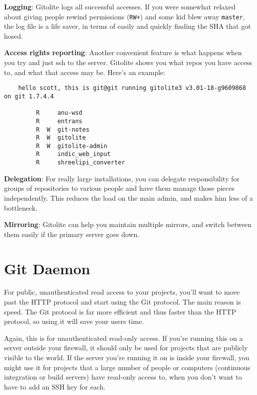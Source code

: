 \documentclass[a4paper]{book}
\begin{document}
\textbf{Logging}: Gitolite logs all successful accesses. If you were somewhat relaxed about giving people rewind permissions (\texttt{RW+}) and some kid blew away \texttt{master}, the log file is a life saver, in terms of easily and quickly finding the SHA that got hosed.

\textbf{Access rights reporting}: Another convenient feature is what happens when you try and just ssh to the server. Gitolite shows you what repos you have access to, and what that access may be. Here's an example:

\begin{shaded}\begin{verbatim}
    hello scott, this is git@git running gitolite3 v3.01-18-g9609868 on git 1.7.4.4

         R     anu-wsd
         R     entrans
         R  W  git-notes
         R  W  gitolite
         R  W  gitolite-admin
         R     indic_web_input
         R     shreelipi_converter
\end{verbatim}\end{shaded}

\textbf{Delegation}: For really large installations, you can delegate responsibility for groups of repositories to various people and have them manage those pieces independently. This reduces the load on the main admin, and makes him less of a bottleneck.

\textbf{Mirroring}: Gitolite can help you maintain multiple mirrors, and switch between them easily if the primary server goes down.

\section{Git Daemon}\label{git-daemon}

For public, unauthenticated read access to your projects, you'll want to move past the HTTP protocol and start using the Git protocol. The main reason is speed. The Git protocol is far more efficient and thus faster than the HTTP protocol, so using it will save your users time.

Again, this is for unauthenticated read-only access. If you're running this on a server outside your firewall, it should only be used for projects that are publicly visible to the world. If the server you're running it on is inside your firewall, you might use it for projects that a large number of people or computers (continuous integration or build servers) have read-only access to, when you don't want to have to add an SSH key for each.
\end{document}
